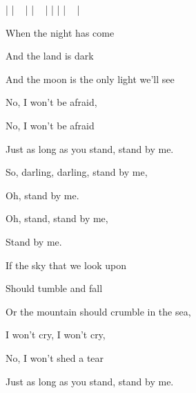 

|  | ~ |   | ~ |   |   |   | ~ |

\zs
When the night has come

And the land is dark

And the moon is the only light we'll see

No, I won't be afraid,

No, I won't be afraid

Just as long as you stand, stand by me.
\ks

\zr
So, darling, darling, stand by me,

Oh, stand by me.

Oh, stand, stand by me,

Stand by me.
\kr

\zs
  If the sky that we look upon

  Should tumble and fall

  Or the mountain should crumble in the sea,

  I won't cry, I won't cry,

  No, I won't shed a tear

  Just as long as you stand, stand by me.
\ks

\kp
